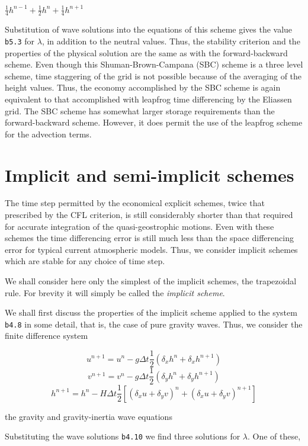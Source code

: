\(\frac{1}{4}h^{n - 1} + \frac{1}{2}h^{n} + \frac{1}{4}h^{n + 1}\)

Substitution of wave solutions into the equations of this scheme gives
the value \texttt{b5.3} for \(\lambda\), in addition to the neutral
values. Thus, the stability criterion and the properties of the
physical solution are the same as with the forward-backward scheme. Even
though this Shuman-Brown-Campana (SBC) scheme is a three level scheme,
time staggering of the grid is not possible because of the averaging of
the height values. Thus, the economy accomplished by the SBC scheme is
again equivalent to that accomplished with leapfrog time differencing by
the Eliassen grid. The SBC scheme has somewhat larger storage
requirements than the forward-backward scheme. However, it does permit
the use of the leapfrog scheme for the advection terms.

\section{Implicit and semi-implicit
schemes}\label{sec:implicit-semi-implicit-schemes}

The time step permitted by the economical explicit schemes, twice that
prescribed by the CFL criterion, is still considerably shorter than that
required for accurate integration of the quasi-geostrophic motions. Even
with these schemes the time differencing error is still much less than
the space differencing error for typical current atmospheric models.
Thus, we consider implicit schemes which are stable for any choice of
time step.

We shall consider here only the simplest of the implicit schemes, the
trapezoidal rule. For brevity it will simply be called the
\emph{implicit scheme}.

We shall first discuss the properties of the implicit scheme applied to
the system \texttt{b4.8} in some detail, that is, the case of pure
gravity waves. Thus, we consider the finite difference system

\[u^{n + 1} = u^{n} - g\Delta t\frac{1}{2}\left( \delta_{x}h^{n} + \delta_{x}h^{n + 1} \right)\]\[v^{n + 1} = v^{n} - g\Delta t\frac{1}{2}\left( \delta_{y}h^{n} + \delta_{y}h^{n + 1} \right)\]\[h^{n + 1} = h^{n} - H\Delta t\frac{1}{2}\left[
\left( \delta_x u + \delta_{y}v \right)^{n} + \left( \delta_{x}u + \delta_{y}v \right)^{n + 1} \right]\]

the gravity and gravity-inertia wave equations

Substituting the wave solutions \texttt{b4.10} we find three solutions
for \(\lambda\). One of these,


